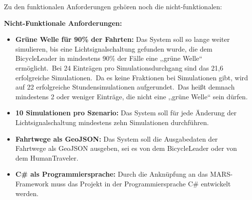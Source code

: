 Zu den funktionalen Anforderungen gehören noch die nicht-funktionalen:

\textbf{Nicht-Funktionale Anforderungen:}

\begin{itemize}
    \item \textbf{Grüne Welle für 90\% der Fahrten:} Das System soll so lange weiter simulieren, bis eine Lichtsignalschaltung gefunden wurde, die dem BicycleLeader in mindestens 90\% der Fälle eine ,,grüne Welle`` ermöglicht.~Bei 24 Einträgen pro Simulationsdurchgang sind das 21,6 erfolgreiche Simulationen.~Da es keine Fraktionen bei Simulationen gibt, wird auf 22 erfolgreiche Stundensimulationen aufgerundet.~Das heißt demnach mindestens 2 oder weniger Einträge, die nicht eine ,,grüne Welle`` sein dürfen.
    \item \textbf{10 Simulationen pro Szenario:} Das System soll für jede Änderung der Lichtsignalschaltung mindestens zehn Simulationen durchführen.
    \item \textbf{Fahrtwege als GeoJSON:} Das System soll die Ausgabedaten der Fahrtwege als GeoJSON ausgeben, sei es von dem BicycleLeader oder von dem HumanTraveler.
    \item \textbf{C\# als Programmiersprache:} Durch die Anknüpfung an das MARS-Framework muss das Projekt in der Programmiersprache C\# entwickelt werden.
\end{itemize}
